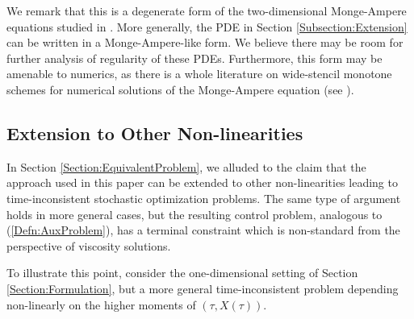 \documentclass[11pt]{article}
\begin{document}
We remark that this is a degenerate form of the two-dimensional Monge-Ampere equations studied in \cite{Schulz1990}. More generally, the PDE in Section \ref{Subsection:Extension} can be written in a Monge-Ampere-like form. We believe there may be room for further analysis of regularity of these PDEs. Furthermore, this form may be amenable to numerics, as there is a whole literature on wide-stencil monotone schemes for numerical solutions of the Monge-Ampere equation (see \cite{Oberman2008}).

\subsection{Extension to Other Non-linearities}\label{Subsection:GeneralInconsistentcies}

In Section \ref{Section:EquivalentProblem}, we alluded to the claim that the approach used in this paper can be extended to other non-linearities leading to time-inconsistent stochastic optimization problems. The same type of argument holds in more general cases, but the resulting control problem, analogous to (\ref{Defn:AuxProblem}), has a terminal constraint which is non-standard from the perspective of viscosity solutions.

To illustrate this point, consider the one-dimensional setting of Section \ref{Section:Formulation}, but a more general time-inconsistent problem depending non-linearly on the higher moments of $(\tau,X(\tau))$.
\end{document}
